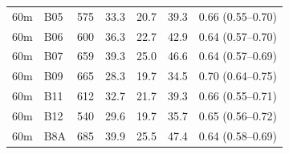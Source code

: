 \begin{table}[t]
\begin{tabular}{llrrrrl}
60m & B05 & 575 & 33.3 & 20.7 & 39.3 & 0.66 (0.55--0.70) \\
60m & B06 & 600 & 36.3 & 22.7 & 42.9 & 0.64 (0.57--0.70) \\
60m & B07 & 659 & 39.3 & 25.0 & 46.6 & 0.64 (0.57--0.69) \\
60m & B09 & 665 & 28.3 & 19.7 & 34.5 & 0.70 (0.64--0.75) \\
60m & B11 & 612 & 32.7 & 21.7 & 39.3 & 0.66 (0.55--0.71) \\
60m & B12 & 540 & 29.6 & 19.7 & 35.7 & 0.65 (0.56--0.72) \\
60m & B8A & 685 & 39.9 & 25.5 & 47.4 & 0.64 (0.58--0.69) \\
\bottomrule
\end{tabular}
\end{table}
